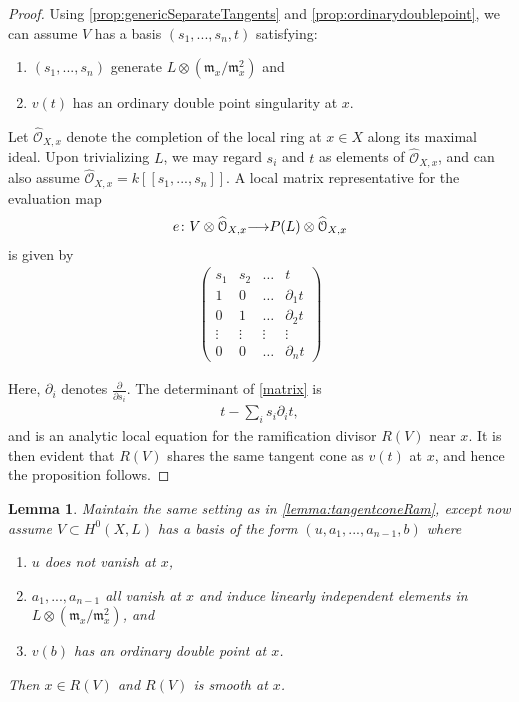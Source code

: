 \documentclass[11pt,reqno]{amsart}
\theoremstyle{plain}
\newtheorem{lemma}[theorem]{Lemma}
\theoremstyle{definition}
\theoremstyle{remark}
\numberwithin{equation}{section}
\renewcommand{\to}{{\longrightarrow}}
\numberwithin{equation}{section}
\renewcommand{\O}{\mathcal O}
\begin{document}
\begin{proof}
  Using \autoref{prop:genericSeparateTangents} and \autoref{prop:ordinarydoublepoint}, we can assume $V$ has a basis $(s_{1}, ..., s_{n}, t)$ satisfying: 
  \begin{enumerate}
      \item $(s_{1}, ..., s_{n})$ generate $L \otimes ({\mathfrak m}_{x}/{\mathfrak m}^{2}_{x})$ and
      \item $v(t)$ has an ordinary double point singularity at $x$.
    \end{enumerate}  

Let $\widehat{\O}_{X,x}$ denote the completion of the local ring at $x \in X$ along its maximal ideal.  Upon trivializing $L$, we may regard $s_{i}$ and $t$ as elements of $\widehat{\O}_{X,x}$, and can also assume  $\widehat{\O}_{X,x} = k[[s_{1}, ..., s_{n}]]$. A local matrix representative for the evaluation map 
\begin{align*}
  e\from V \otimes \widehat{\O}_{X,x} \to P(L) \otimes \widehat{\O}_{X,x}
\end{align*}
is given by 
\begin{align}\label{matrix}
\begin{pmatrix}
  s_{1} & s_{2} & \dots & t \\
  1 & 0 & \dots & \partial_{1}t \\
  0 & 1 & \dots & \partial_{2}t \\
  \vdots & \vdots & \vdots & \vdots \\
  0 & 0 & \dots & \partial_{n}t
\end{pmatrix}
\end{align}

Here, $\partial_{i}$ denotes $\frac{\partial}{\partial s_{i}}$. The determinant of \ref{matrix} is 
\begin{align*}
  t - \sum_{i}s_{i}\partial_{i}t,
\end{align*}
and is an analytic local equation for the ramification divisor $R(V)$ near $x$.  It is then evident that $R(V)$ shares the same tangent cone as $v(t)$ at $x$, and hence the proposition follows.
\end{proof}

\begin{lemma}\label{lemma:basepointfree}
  Maintain the same setting as in \autoref{lemma:tangentconeRam}, except now assume $V \subset H^{0}(X,L)$ has a basis of the form $(u,a_{1}, ..., a_{n-1}, b)$ where 
  \begin{enumerate}
    \item $u$ does not vanish at $x$,
    \item $a_{1}, ..., a_{n-1}$ all vanish at $x$ and induce linearly independent elements in $L \otimes ({\mathfrak m}_{x}/{\mathfrak m}^{2}_{x})$, and
    \item $v(b)$ has an ordinary double point at $x$. 
  \end{enumerate}
  Then $x \in R(V)$ and $R(V)$ is smooth at $x$.
\end{lemma}
\end{document}
